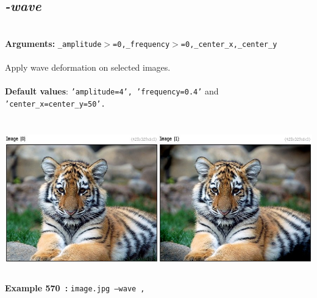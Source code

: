 \documentclass[a4paper,11pt,twoside]{book}
\begin{document}
\subsection{\emph{-wave} }\vspace*{-0.5em}
~\\\textbf{Arguments: } 
{\small \texttt{\_amplitude$>$=0,\_frequency$>$=0,\_center\_x,\_center\_y}}\\~\\
Apply wave deformation on selected images.
~\\~\\\textbf{Default values}: {\small \texttt{'amplitude=4', 'frequency=0.4'} and \texttt{'center\_x=center\_y=50'.}}
\begin{center}\includegraphics[keepaspectratio=true,height=7cm,width=\textwidth]{img/gmic_def570.jpg}\\
{\footnotesize \textbf{Example 570~:} \texttt{image.jpg --wave ,}}
\end{center}
\end{document}
